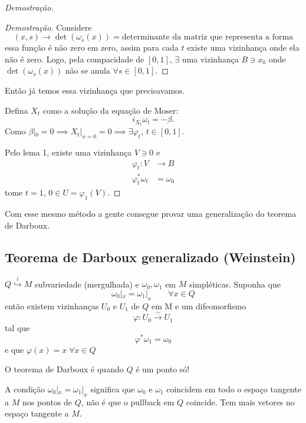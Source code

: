 \begin{proof}[Demostra\c c\~ao]
\begin{proof}[Demostra\c c\~ao]
	Considere
	\[(x,s)\to \det (\omega_s(x))=\text{determinante da matriz que representa a forma} \]
	essa fun\c c\~ao \'e n\~ao zero em zero, assim para cada $t$ existe uma vizinhança onde ela n\~ao \'e zero. Logo, pela compacidade de $[0,1]$, $ \exists $ uma vizinhança $B\ni x_0$ onde $\det (\omega_s(x))$ n\~ao se anula $\forall s\in [0,1]$.
\end{proof}

Ent\~ao j\'a temos essa vizinhança que precisavamos.

Defina $X_t$ como a solu\c c\~ao da equa\c c\~ao de Moser:
\[i_{X_t}\omega_t=-\beta.\]
Como $\beta|_{0}=0\implies X_t|_{x=0}=0\implies \exists \varphi_t$, $t\in [0,1]$.

Pelo lema 1, existe uma vizinhança $V\ni 0$ e 
\begin{align*}
	\varphi_t: V &\longrightarrow B \\
	\varphi_t^*\omega_t&=\omega_0 
\end{align*}
tome $t=1$, $0\in U=\varphi_1(V)$.
\end{proof}

Com esse mesmo m\'etodo a gente consegue provar uma generaliza\c c\~ao do teorema de Darboux.

\subsection{Teorema de Darboux generalizado (Weinstein)}

\begin{thm}
	$Q\overset{i}{\hookrightarrow}M$ subvariedade (mergulhada) e $\omega_0,\omega_1$ em $M$ simpl\'eticas. Suponha que
	\[\omega_0|_{x}=\omega_1|_{x}\qquad \forall x\in Q\]
	ent\~ao existem vizinhanças $U_0$ e $U_1$ de $Q$ em M e um difeomorfismo
	\[\varphi:U_0\overset{\sim}{\longrightarrow}U_1  \]
	tal que 
	\[\varphi^*\omega_1=\omega_0\]
	e que $\varphi(x)=x\;\forall x\in Q$
\end{thm}

\begin{remark}
	O teorema de Darboux \'e quando $Q$ \'e um ponto s\'o!
\end{remark}

\begin{remark}
	A condi\c c\~ao $\omega_0|_{x}=\omega_1|_{x}$ significa que $\omega_0$ e $\omega_1$ coincidem em todo o espaço tangente a $M$ nos pontos de $Q$, n\~ao \'e que o pullback em $Q$ coincide. Tem mais vetores no espaço tangente a $M$.
\end{remark}

